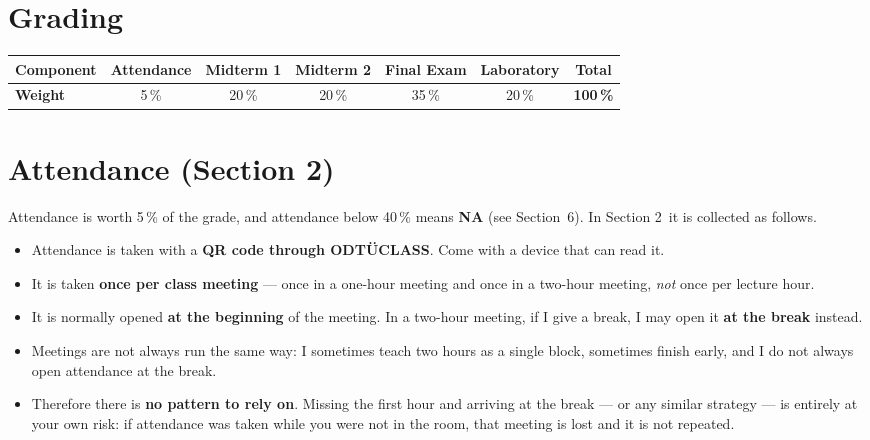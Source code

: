 \documentclass[10pt,a4paper]{article}
\newcommand{\mysection}{Section 2}
\begin{document}
\section{Grading}

\begin{center}
\small
\begin{tabular}{l c c c c c @{\hskip 1.4em} c}
\toprule
\textbf{Component} & Attendance & Midterm 1 & Midterm 2 & Final Exam & Laboratory & \textbf{Total}\\
\midrule
\textbf{Weight} & 5\,\% & 20\,\% & 20\,\% & 35\,\% & 20\,\% & \textbf{100\,\%}\\
\bottomrule
\end{tabular}
\end{center}
\vspace{-0.3em}

\section{Attendance \normalfont\small\color{metugray}(\mysection)}

Attendance is worth 5\,\% of the grade, and attendance below 40\,\% means \textbf{NA}
(see Section~6). In \mysection\ it is collected as follows.

\begin{itemize}
  \item Attendance is taken with a \textbf{QR code through ODTÜCLASS}. Come with a device that
        can read it.
  \item It is taken \textbf{once per class meeting} --- once in a one-hour meeting and once in a
        two-hour meeting, \emph{not} once per lecture hour.
  \item It is normally opened \textbf{at the beginning} of the meeting. In a two-hour meeting,
        if I give a break, I may open it \textbf{at the break} instead.
  \item Meetings are not always run the same way: I sometimes teach two hours as a single block,
        sometimes finish early, and I do not always open attendance at the break.
  \item Therefore there is \textbf{no pattern to rely on}. Missing the first hour and arriving at
        the break --- or any similar strategy --- is entirely at your own risk: if attendance was
        taken while you were not in the room, that meeting is lost and it is not repeated.
\end{itemize}
\end{document}
